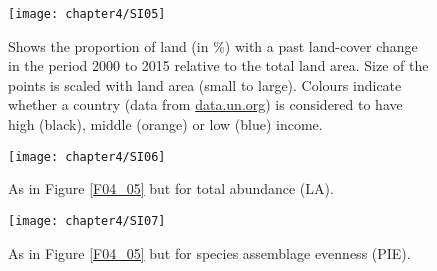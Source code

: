 \begin{figure}[htb]
\centering
\texttt{[image: chapter4/SI05]}
\caption{ Shows the proportion of land (in \%) with a past land-cover change in the period 2000 to 2015 relative to the total land area. Size of the points is scaled with land area (small to large). Colours indicate whether a country (data from \href{data.un.org}{data.un.org}) is considered to have high (black), middle (orange) or low (blue) income.}
\label{SI04_05}
\end{figure}

\begin{figure}[htb]
\centering
\texttt{[image: chapter4/SI06]}
\caption{ As in Figure \ref{F04_05} but for total abundance (LA). }
\label{SI04_06}
\end{figure}

\begin{figure}[htb]
\centering
\texttt{[image: chapter4/SI07]}
\caption{As in Figure \ref{F04_05} but for species assemblage evenness (PIE). }
\label{SI04_07}
\end{figure}

